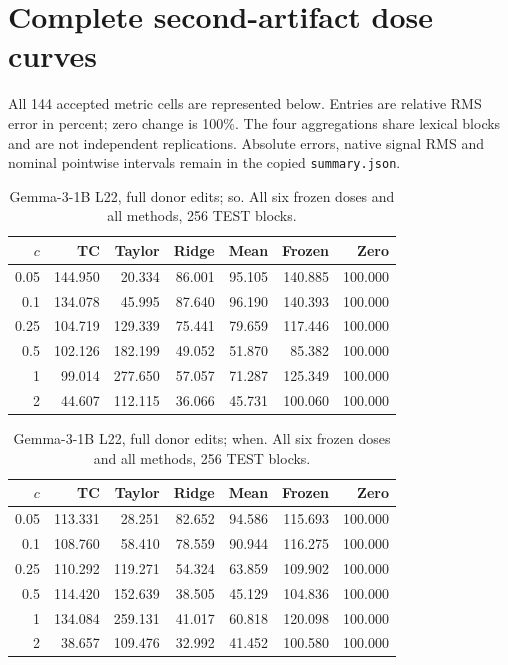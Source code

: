 \section{Complete second-artifact dose curves}\label{app:secondcurve}
All 144 accepted metric cells are represented below. Entries are relative RMS error in percent; zero change is 100\%. The four aggregations share lexical blocks and are not independent replications. Absolute errors, native signal RMS and nominal pointwise intervals remain in the copied \texttt{summary.json}.
\begin{table}[!ht]\centering\small
\begin{tabular}{rrrrrrr}\toprule
$c$ & TC & Taylor & Ridge & Mean & Frozen & Zero\\\midrule
0.05 & 144.950 & 20.334 & 86.001 & 95.105 & 140.885 & 100.000\\
0.1 & 134.078 & 45.995 & 87.640 & 96.190 & 140.393 & 100.000\\
0.25 & 104.719 & 129.339 & 75.441 & 79.659 & 117.446 & 100.000\\
0.5 & 102.126 & 182.199 & 49.052 & 51.870 & 85.382 & 100.000\\
1 & 99.014 & 277.650 & 57.057 & 71.287 & 125.349 & 100.000\\
2 & 44.607 & 112.115 & 36.066 & 45.731 & 100.060 & 100.000\\
\bottomrule\end{tabular}
\caption{Gemma-3-1B L22, full donor edits; so. All six frozen doses and all methods, 256 TEST blocks.}\end{table}
\begin{table}[!ht]\centering\small
\begin{tabular}{rrrrrrr}\toprule
$c$ & TC & Taylor & Ridge & Mean & Frozen & Zero\\\midrule
0.05 & 113.331 & 28.251 & 82.652 & 94.586 & 115.693 & 100.000\\
0.1 & 108.760 & 58.410 & 78.559 & 90.944 & 116.275 & 100.000\\
0.25 & 110.292 & 119.271 & 54.324 & 63.859 & 109.902 & 100.000\\
0.5 & 114.420 & 152.639 & 38.505 & 45.129 & 104.836 & 100.000\\
1 & 134.084 & 259.131 & 41.017 & 60.818 & 120.098 & 100.000\\
2 & 38.657 & 109.476 & 32.992 & 41.452 & 100.580 & 100.000\\
\bottomrule\end{tabular}
\caption{Gemma-3-1B L22, full donor edits; when. All six frozen doses and all methods, 256 TEST blocks.}\end{table}
